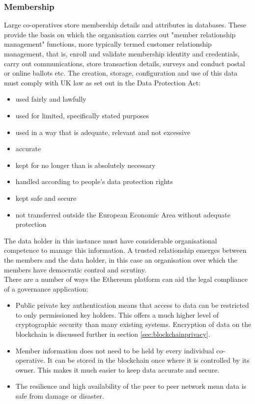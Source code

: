 \subsubsection{Membership}
Large co-operatives store membership details and attributes in databases. These provide the basis on which the organisation carries out "member relationship management" functions, more typically termed customer relationship management, that is, enroll and validate membership identity and credentials, carry out communications, store transaction details, surveys and conduct postal or online ballots etc.  The creation, storage, configuration and use of this data must comply with UK law as set out in the Data Protection Act\cite{DataProtection}: 
\begin{itemize}
\item used fairly and lawfully
\item used for limited, specifically stated purposes
\item used in a way that is adequate, relevant and not excessive
\item accurate
\item kept for no longer than is absolutely necessary
\item handled according to people's data protection rights
\item kept safe and secure
\item not transferred outside the European Economic Area without adequate protection
\end{itemize}

The data holder in this instance must have considerable organisational competence to manage this information. A trusted relationship emerges between the members and the data holder, in this case an organisation over which the members have democratic control and scrutiny.\\

There are a number of ways the Ethereum platform can aid the legal compliance of a governance application:
\begin{itemize}
\item Public private key authentication means that access to data can be restricted to only permissioned key holders. This offers a much higher level of cryptographic security than many existing systems. Encryption of data on the blockchain is discussed further in section \ref{sec:blockchainprivacy}.
\item Member information does not need to be held by every individual co-operative. It can be stored in the blockchain once where it is controlled by its owner. This makes it much easier to keep data accurate and secure.
\item The resilience and high availability of the peer to peer network mean data is safe from damage or disaster.
\end{itemize}

